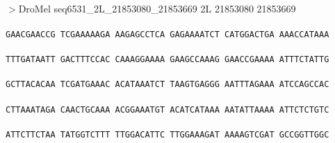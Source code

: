 \documentclass[11pt,twoside,reqno,a4paper]{article}
\begin{document}
\\
$>$DroMel	seq6531\_2L\_21853080\_21853669	2L	21853080	21853669 \\
 \\
\texttt{GAACGAACCG	TCGAAAAAGA	AAGAGCCTCA	GAGAAAATCT	CATGGACTGA	AAACCATAAA	\\
\hspace*{1\charwidth}\hspace*{1\charwidth}\hspace*{1\charwidth}\hspace*{1\charwidth}\hspace*{1\charwidth}\hspace*{1\charwidth}\\
TTTGATAATT	GACTTTCCAC	CAAAGGAAAA	GAAGCCAAAG	GAACCGAAAA	ATTTCTATTG	\\
\hspace*{1\charwidth}\hspace*{1\charwidth}\hspace*{1\charwidth}\hspace*{1\charwidth}\hspace*{1\charwidth}\hspace*{1\charwidth}\\
GCTTACACAA	TCGATGAAAC	ACATAAATCT	TAAGTGAGGG	AATTTAGAAA	ATCCAGCCAC	\\
\hspace*{1\charwidth}\hspace*{1\charwidth}\hspace*{1\charwidth}\hspace*{1\charwidth}\hspace*{1\charwidth}\hspace*{1\charwidth}\\
CTTAAATAGA	CAACTGCAAA	ACGGAAATGT	ACATCATAAA	AATATTAAAA	ATTCTCTGTC	\\
\hspace*{1\charwidth}\hspace*{1\charwidth}\hspace*{1\charwidth}\hspace*{1\charwidth}\hspace*{1\charwidth}\hspace*{1\charwidth}\\
ATTCTTCTAA	TATGGTCTTT	TTGGACATTC	TTGGAAAGAT	AAAAGTCGAT	GCCGGTTGGC	\\
\hspace*{1\charwidth}\hspace*{1\charwidth}\hspace*{1\charwidth}\hspace*{1\charwidth}\hspace*{1\charwidth}\hspace*{1\charwidth}\\
}
\end{document}
